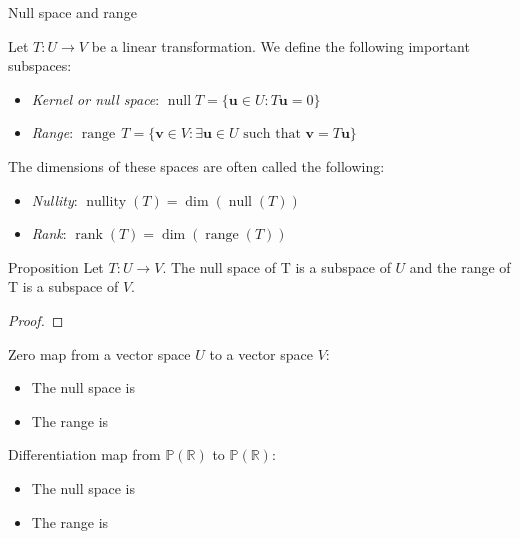 \documentclass [aspectratio=169]{beamer}
\newcommand{\bu}{{\mathbf{u}}}
\newcommand{\bv}{{\mathbf{v}}}
\newcommand{\R}{{\mathbb{R}}}
\DeclareMathOperator{\range}{range}
\DeclareMathOperator{\rank}{rank}
\DeclareMathOperator{\nullspace}{null}
\DeclareMathOperator{\nullity}{nullity}
\begin{document}
\begin{frame}{Null space and range}
\begin{definition}
Let $T:U \to V$ be a linear transformation. We define the following important subspaces:
\begin{itemize}
\item \emph{Kernel or null space}: $\nullspace T = \{\bu \in U : T\bu = 0 \}$
\item \emph{Range}: $\range \, T = \{\bv \in V : \exists \bu \in U \text{ such that } \bv = T \bu \}$
\end{itemize}

\vspace{1em}

The dimensions of these spaces are often called the following:
\begin{itemize}
\item \emph{Nullity}: $\nullity(T) = \dim(\nullspace(T))$
\item \emph{Rank}: $\rank(T) = \dim(\range(T))$
\end{itemize}
\end{definition}


\end{frame}



\begin{frame}
\begin{exampleblock}{Proposition}
Let $T: U \to V$. The null space of T is a subspace of $U$ and the range of T is a subspace of $V$.
\end{exampleblock}
\begin{proof}
\vspace{4cm}
\end{proof}


\end{frame}




\begin{frame}

\begin{example}
Zero map from a vector space $U$ to a vector space $V$:
\begin{itemize}
    \item The null space is 
    \item The range is 
\end{itemize}
\vspace{1em}

Differentiation map from $\mathbb{P}(\R)$ to $\mathbb{P}(\R)$:
\begin{itemize}
    \item The null space is 
    \item The range is 
\end{itemize}
\vspace{1em}
\end{example}

\end{frame}
\end{document}
